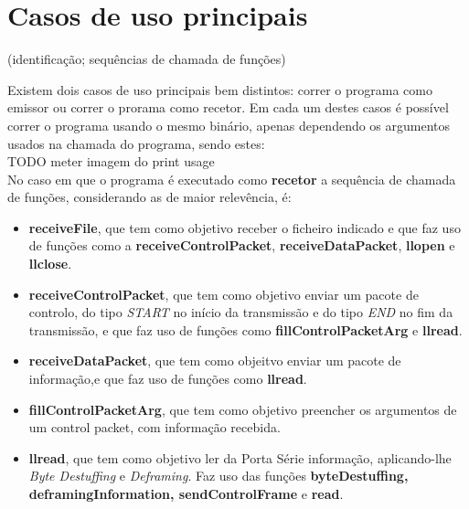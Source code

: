 \documentclass[a4paper, 11pt]{article}
\begin{document}
\newpage

\section{Casos de uso principais}

(identificação; sequências de chamada de funções)

Existem dois casos de uso principais bem distintos: correr o programa como emissor ou correr o prorama como recetor. Em cada um destes casos é possível correr o programa usando o mesmo binário, apenas dependendo os argumentos usados na chamada do programa, sendo estes:\\
TODO meter imagem do print usage\\

No caso em que o programa é executado como \textbf{recetor} a sequência de chamada de funções, considerando as de maior relevência, é:
\begin{itemize}
	\item \textbf{receiveFile}, que tem como objetivo receber o ficheiro indicado e que faz uso de funções como a \textbf{receiveControlPacket}, \textbf{receiveDataPacket}, \textbf{llopen} e \textbf{llclose}.
	\item \textbf{receiveControlPacket}, que tem como objetivo enviar um pacote de controlo, do tipo \textit{START} no início da transmissão e do tipo \textit{END} no fim da transmissão, e que faz uso de funções como \textbf{fillControlPacketArg} e \textbf{llread}.
	\item \textbf{receiveDataPacket},  que tem como objeitvo enviar um pacote de informação,e que faz uso de funções como \textbf{llread}.
	\item \textbf{fillControlPacketArg}, que tem como objetivo preencher os argumentos de um control packet, com informação recebida.
	\item \textbf{llread}, que tem como objetivo ler da Porta Série informação, aplicando-lhe \textit{Byte Destuffing} e \textit{Deframing}. Faz uso das funções \textbf{byteDestuffing, deframingInformation, sendControlFrame} e \textbf{read}.
\end{itemize}
\end{document}
